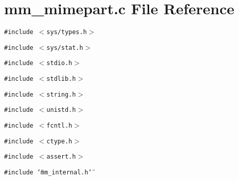\section{mm\_\-mimepart.c File Reference}
\label{mm__mimepart_8c}
{\tt \#include $<$sys/types.h$>$}\par
{\tt \#include $<$sys/stat.h$>$}\par
{\tt \#include $<$stdio.h$>$}\par
{\tt \#include $<$stdlib.h$>$}\par
{\tt \#include $<$string.h$>$}\par
{\tt \#include $<$unistd.h$>$}\par
{\tt \#include $<$fcntl.h$>$}\par
{\tt \#include $<$ctype.h$>$}\par
{\tt \#include $<$assert.h$>$}\par
{\tt \#include \char`\"{}mm\_\-internal.h\char`\"{}}\par
